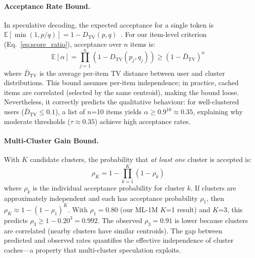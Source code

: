 \documentclass[sigconf,nonacm=false]{acmart}
\begin{document}
\paragraph{Acceptance Rate Bound.}
In speculative decoding, the expected acceptance for a single token is $\mathbb{E}[\min(1, p/q)] = 1 - D_{\text{TV}}(p, q)$~\cite{leviathan2023}. For our item-level criterion (Eq.~\ref{eq:score_ratio}), acceptance over $n$ items is:
\begin{equation}
\mathbb{E}[\alpha] = \prod_{j=1}^{n} \left(1 - D_{\text{TV}}(p_j, q_j)\right) \geq \left(1 - \bar{D}_{\text{TV}}\right)^n
\label{eq:accept_bound}
\end{equation}
where $\bar{D}_{\text{TV}}$ is the average per-item TV distance between user and cluster distributions. This bound assumes per-item independence; in practice, cached items are correlated (selected by the same centroid), making the bound loose. Nevertheless, it correctly predicts the qualitative behaviour: for well-clustered users ($\bar{D}_{\text{TV}} \leq 0.1$), a list of $n$=10 items yields $\alpha \geq 0.9^{10} \approx 0.35$, explaining why moderate thresholds ($\tau \approx 0.35$) achieve high acceptance rates.

\paragraph{Multi-Cluster Gain Bound.}
With $K$ candidate clusters, the probability that \emph{at least one} cluster is accepted is:
\begin{equation}
\rho_K = 1 - \prod_{k=1}^{K} (1 - \rho_k)
\label{eq:mcg_bound}
\end{equation}
where $\rho_k$ is the individual acceptance probability for cluster $k$. If clusters are approximately independent and each has acceptance probability $\rho_1$, then $\rho_K \approx 1 - (1 - \rho_1)^K$. With $\rho_1 = 0.80$ (our ML-1M $K$=1 result) and $K$=3, this predicts $\rho_3 \geq 1 - 0.20^3 = 0.992$. The observed $\rho_3 = 0.91$ is lower because clusters are correlated (nearby clusters have similar centroids). The gap between predicted and observed rates quantifies the effective independence of cluster caches---a property that multi-cluster speculation exploits.
\end{document}
